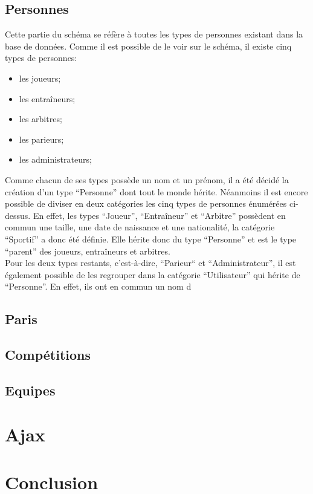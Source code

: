 \documentclass[10pt,a4paper,titlepage]{article}
\begin{document}
\subsection{Personnes}
Cette partie du schéma se réfère à toutes les types de personnes existant dans la base de données. Comme il est possible de le voir sur le schéma, il existe cinq types de personnes:
\begin{itemize}
	\item{les joueurs;}
	\item{les entraîneurs;}
	\item{les arbitres;}
	\item{les parieurs;}
	\item{les administrateurs;}
\end{itemize}

Comme chacun de ses types possède un nom et un prénom, il a été décidé la création d'un type “Personne” dont tout le monde hérite. Néanmoins il est encore possible de diviser en deux catégories les cinq types de personnes énumérées ci-dessus. En effet, les types “Joueur”, “Entraîneur” et “Arbitre” possèdent en commun une taille, une date de naissance et une nationalité, la catégorie “Sportif” a donc été définie. Elle hérite donc du type “Personne” et est le type “parent” des joueurs, entraîneurs et arbitres.\\

Pour les deux types restants, c'est-à-dire, “Parieur“ et “Administrateur”, il est également possible de les regrouper dans la catégorie “Utilisateur” qui hérite de “Personne”. En effet, ils ont en commun un nom d

\subsection{Paris}
\subsection{Compétitions}
\subsection{Equipes}

\section{Ajax}

\section{Conclusion}
\end{document}
